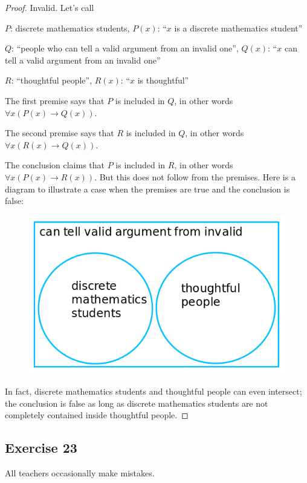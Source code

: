 \documentclass[14pt]{extarticle}
\newcommand{\fa}{\forall}
\begin{document}
\begin{proof}
Invalid. Let's call 

$P$: discrete mathematics students, $P(x)$: ``$x$ is a discrete mathematics student'' 

$Q$: ``people who can tell a valid argument from an invalid one'', $Q(x)$: ``$x$ can tell a valid argument from an invalid one''

$R$: ``thoughtful people'', $R(x)$: ``$x$ is thoughtful''

The first premise says that $P$ is included in $Q$, in other words $\fa x (P(x) \to Q(x))$.

The second premise says that $R$ is included in $Q$, in other words $\fa x (R(x) \to Q(x))$.

The conclusion claims that $P$ is included in $R$, in other words $\fa x (P(x) \to R(x))$. But this does not follow from the premises. Here is a diagram to illustrate a case when the premises are true and the conclusion is false:

\begin{figure}[ht!]
\centering
\includegraphics[scale=0.5]{../images/3.4.22.png}
\end{figure}

In fact, discrete mathematics students and thoughtful people can even intersect; the conclusion is false as long as discrete mathematics students are not completely contained inside thoughtful people.
\end{proof}

\subsection{Exercise 23}
All teachers occasionally make mistakes.
\end{document}
